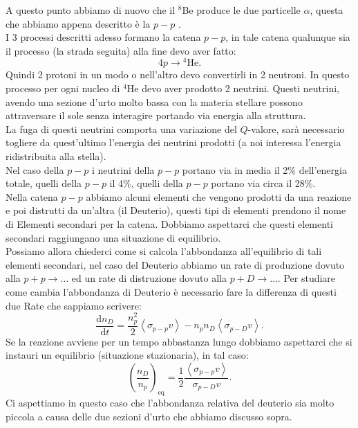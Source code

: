 A questo punto abbiamo di nuovo che il ${}^8$Be produce le due particelle $\alpha$, questa che abbiamo appena descritto è la $p-p$ .\\
I 3 processi descritti adesso formano la catena $p-p$, in tale catena qualunque sia il processo (la strada seguita) alla fine devo aver fatto:
\[
    4p\to {}^4\text{He}
.\] 
Quindi 2 protoni in un modo o nell'altro devo convertirli in 2 neutroni. In questo processo per ogni nucleo di ${}^4$He devo aver prodotto 2 neutrini. Questi neutrini, avendo una sezione d'urto molto bassa con la materia stellare possono attraversare il sole senza interagire portando via energia alla struttura.\\
La fuga di questi neutrini comporta una variazione del $Q$-valore, sarà necessario togliere da quest'ultimo l'energia dei neutrini prodotti (a noi interessa l'energia ridistribuita alla stella).\\
Nel caso della $p-p$ i neutrini della $p-p$  portano via in media il 2\% dell'energia totale, quelli della $p-p$  il 4\%, quelli della $p-p$  portano via circa il 28\%. \\
Nella catena $p-p$ abbiamo alcuni elementi che vengono prodotti da una reazione e poi distrutti da un'altra (il Deuterio), questi tipi di elementi prendono il nome di Elementi secondari per la catena. Dobbiamo aspettarci che questi elementi secondari raggiungano una situazione di equilibrio.\\
Possiamo allora chiederci come si calcola l'abbondanza all'equilibrio di tali elementi secondari,  nel caso del Deuterio abbiamo un rate di produzione dovuto alla $p+p\to \ldots$ ed un rate di distruzione dovuto alla $p+D\to \ldots$. Per studiare come cambia l'abbondanza di Deuterio è necessario fare la differenza di questi due Rate che sappiamo scrivere:
\[
\frac{\text{d} n_{D}}{\text{d} t} = \frac{n_p^2}{2}\left<\sigma_{p-p}v\right>
- n_pn_D \left<\sigma_{p-D}v\right>
.\] 
Se la reazione avviene per un tempo abbastanza lungo dobbiamo aspettarci che si instauri un equilibrio (situazione stazionaria), in tal caso:
\[
    \left(\frac{n_D}{n_p}\right)_\text{eq} =
    \frac{1}{2}\frac{\left<\sigma_{p-p}v\right>}{\sigma_{p-D}v}
.\] 
Ci aspettiamo in questo caso che l'abbondanza relativa del deuterio sia molto piccola a causa delle due sezioni d'urto che abbiamo discusso sopra.
